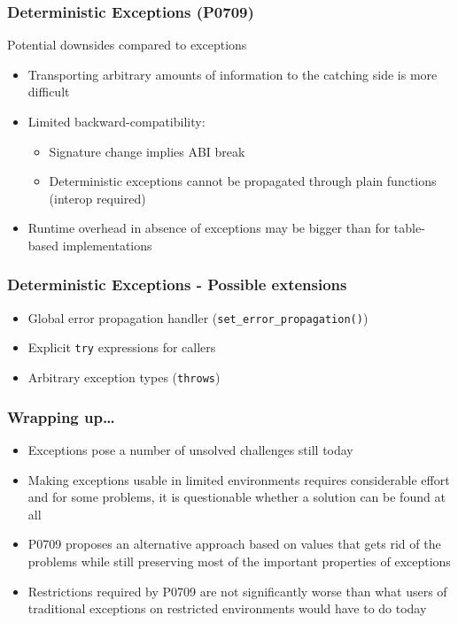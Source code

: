 \documentclass[aspectratio=169]{beamer}
\newif\iftransitions
\newcommand{\cpause}{\iftransitions \pause \fi}
\begin{document}
\begin{frame}
  \frametitle{Deterministic Exceptions (P0709)}

  Potential downsides compared to exceptions
  \begin{itemize}
  \cpause \item Transporting arbitrary amounts of information to the catching side is more difficult
  \cpause \item Limited backward-compatibility:
    \begin{itemize}
    \item Signature change implies ABI break
    \cpause \item Deterministic exceptions cannot be propagated through plain functions (interop required)
    \end{itemize}
  \cpause \item Runtime overhead in absence of exceptions may be bigger than for table-based implementations
  \end{itemize}
\end{frame}


\begin{frame}
  \frametitle{Deterministic Exceptions - Possible extensions}

  \begin{itemize}
  \item Global error propagation handler (\texttt{set\_error\_propagation()})
  \item Explicit \texttt{try} expressions for callers
  \item Arbitrary exception types (\texttt{throws})
  \end{itemize}
\end{frame}


\begin{frame}
  \frametitle{Wrapping up\ldots}

  \begin{itemize}
  \item Exceptions pose a number of unsolved challenges still today
  \item Making exceptions usable in limited environments requires considerable effort and for some problems, it is questionable whether a solution can be found at all
  \item P0709 proposes an alternative approach based on values that gets rid of the problems while still preserving most of the important properties of exceptions
  \item Restrictions required by P0709 are not significantly worse than what users of traditional exceptions on restricted environments would have to do today
  \end{itemize}
\end{frame}
\end{document}

